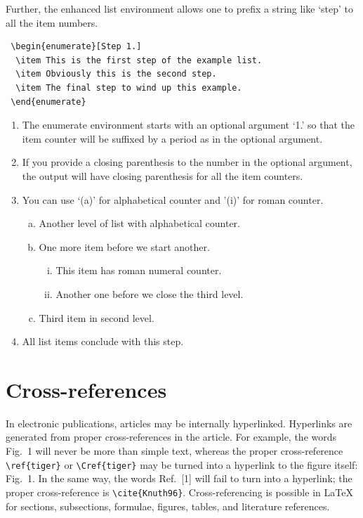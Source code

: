 \documentclass[a4paper,fleqn]{cas-dc}
\begin{document}
Further, the enhanced list environment allows one to prefix a
string like `step' to all the item numbers.  

\begin{verbatim}
 \begin{enumerate}[Step 1.]
  \item This is the first step of the example list.
  \item Obviously this is the second step.
  \item The final step to wind up this example.
 \end{enumerate}
\end{verbatim}

\begin{enumerate}[(1)]
	\item The enumerate environment starts with an optional
	argument ‘1.’ so that the item counter will be suffixed
	by a period as in the optional argument.
	\item If you provide a closing parenthesis to the number in the
	optional argument, the output will have closing parenthesis
	for all the item counters.
	\item You can use ‘(a)’ for alphabetical counter and ’(i)’ for
	roman counter.
	\begin{enumerate}[a)]
		\item Another level of list with alphabetical counter.
		\item One more item before we start another.
		\begin{enumerate}[(i)]
			\item This item has roman numeral counter.
			\item Another one before we close the third level.
		\end{enumerate}
		\item Third item in second level.
	\end{enumerate}
	\item All list items conclude with this step.
\end{enumerate}

\section{Cross-references}
In electronic publications, articles may be internally 
hyperlinked. Hyperlinks are generated from proper cross-references in the article. For example, the words \textcolor{black!80}{Fig.~1} will never be more than simple text,
whereas the proper cross-reference \verb+\ref{tiger}+ or \verb+\Cref{tiger}+ may be
turned into a hyperlink to the figure itself:
Fig.~1. In the same way,
the words Ref.~[1] will fail to turn into a
hyperlink; the proper cross-reference is \verb+\cite{Knuth96}+.
Cross-referencing is possible in \LaTeX{} for sections,
subsections, formulae, figures, tables, and literature
references.
\end{document}
